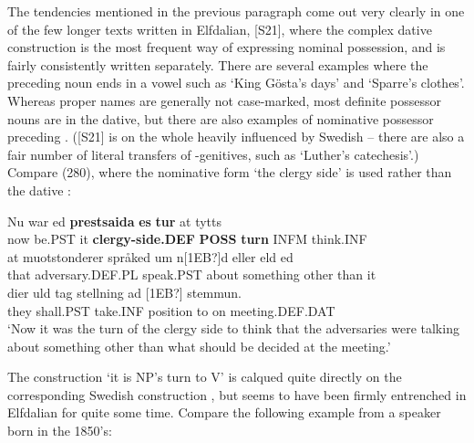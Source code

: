 {{%

The tendencies mentioned in the previous paragraph come out very clearly in one of the few longer texts written in Elfdalian, [S21], where the complex dative construction is the most frequent way of expressing nominal possession, and  is fairly consistently written separately. There are several examples where the preceding noun ends in a vowel such as  ‘King Gösta’s days’ and  ‘Sparre’s clothes’. Whereas proper names are generally not case-marked, most definite possessor nouns are in the dative, but there are also examples of nominative possessor preceding . ([S21] is on the whole heavily influenced by Swedish – there are also a fair number of literal transfers of -genitives, such as ‘Luther’s catechesis’.) Compare (280), where the nominative form  ‘the clergy side’ is used rather than the dative :


\ea\label{}
\gll Nu  war  ed  \textbf{prestsaida} \textbf{es} \textbf{tur} at  tytts\\
now  be.PST  it  \textbf{clergy-side.DEF} \textbf{POSS} \textbf{turn} INFM  think.INF\\
\gll at  muotstonderer  språked  um  n[1EB?]d  eller  eld  ed\\
that  adversary.DEF.PL  speak.PST  about  something  other  than  it\\
\gll dier  uld  tag  stellning  ad  [1EB?]  stemmun.\\
they  shall.PST  take.INF  position  to  on  meeting.DEF.DAT\\
\glt ‘Now it was the turn of the clergy side to think that the adversaries were talking about something other than what should be decided at the meeting.’ 
\z

The construction  ‘it is NP’s turn to V’ is calqued quite directly on the corresponding Swedish construction , but seems to have been firmly entrenched in Elfdalian for quite some time. Compare the following example from a speaker born in the 1850’s:

}}
